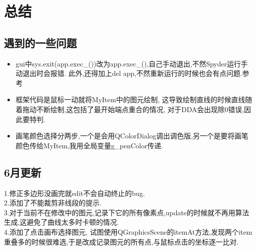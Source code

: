 \documentclass[a4paper,UTF8]{article}
\theoremstyle{definition}
\begin{document}
\section{总结}
\subsection{遇到的一些问题}
\begin{itemize}
	\item gui中sys.exit(app.exec\_())改为app.exec\_(),自己手动退出,不然Spyder运行手动退出时会报错.
	此外,还得加上del app,不然重新运行的时候也会有点问题.参考\cite{exit}
	
	\item 框架代码是鼠标一动就将MyItem中的图元绘制,
	这导致绘制直线的时候直线随着拖动不断绘制,这包括了最开始端点重合的情况,
	对于DDA会出现除0错误,因此要特判.
	
	\item 画笔颜色选择分两步,一个是会用QColorDialog调出调色版,另一个是要将画笔颜色传给MyItem,我用全局变量g\_penColor传递.
\end{itemize}
\subsection{6月更新}
1.修正多边形没画完就edit不会自动终止的bug.\\
2.添加了不能裁剪非线段的提示.\\
3.对于当前不在修改中的图元,记录下它的所有像素点,update的时候就不再用算法生成,这避免了曲线太多时卡顿的情况.\\
4.添加了点击画布选择图元, 试图使用QGraphicsScene的itemAt方法,发现两个item重叠多的时候很难选,于是改成记录图元的所有点,与鼠标点击的坐标逐一比对.\\
%

\end{document}
